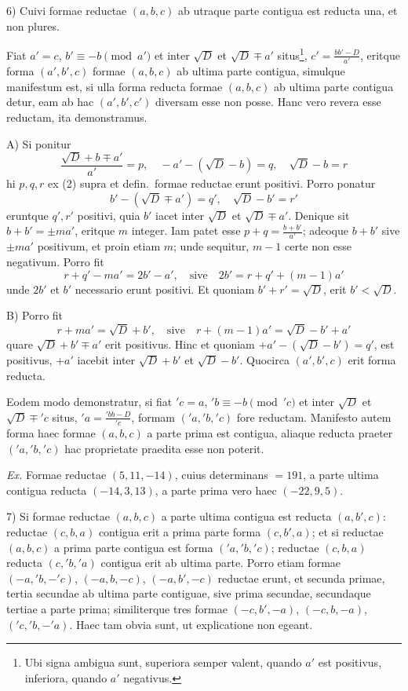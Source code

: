 \documentclass[12pt,a4paper]{article}
\theoremstyle{plain}
\theoremstyle{definition}
\theoremstyle{remark}
\begin{document}
6) Cuivi formae reductae $(a,b,c)$ ab utraque parte contigua est reducta una, et non plures.

Fiat $a'=c$, $b'\equiv -b\pmod{a'}$ et inter $\sqrt{D}$ et $\sqrt{D}\mp a'$ situs\footnote{Ubi signa ambigua sunt, superiora semper valent, quando $a'$ est positivus, inferiora, quando $a'$ negativus.}, $c'=\frac{bb'-D}{a'}$, eritque forma $(a',b',c)$ formae $(a,b,c)$ ab ultima parte contigua, simulque manifestum est, si ulla forma reducta formae $(a,b,c)$ ab ultima parte contigua detur, eam ab hac $(a',b',c')$ diversam esse non posse. Hanc vero revera esse reductam, ita demonstramus.

A) Si ponitur
\[\frac{\sqrt{D}+b\mp a'}{a'}=p,\quad -a'-(\sqrt{D}-b)=q,\quad \sqrt{D}-b=r\]
hi $p,q,r$ ex (2) supra et defin.\ formae reductae erunt positivi. Porro ponatur
\[b'-(\sqrt{D}\mp a')=q',\quad \sqrt{D}-b'=r'\]
eruntque $q',r'$ positivi, quia $b'$ iacet inter $\sqrt{D}$ et $\sqrt{D}\mp a'$. Denique sit $b+b'=\pm ma'$, eritque $m$ integer. Iam patet esse $p+q=\frac{b+b'}{a'}$; adeoque $b+b'$ sive $\pm ma'$ positivum, et proin etiam $m$; unde sequitur, $m-1$ certe non esse negativum. Porro fit
\[r+q'-ma'=2b'-a',\quad\text{sive}\quad 2b'=r+q'+(m-1)a'\]
unde $2b'$ et $b'$ necessario erunt positivi. Et quoniam $b'+r'=\sqrt{D}$, erit $b'<\sqrt{D}$.

B) Porro fit
\[r+ma'=\sqrt{D}+b',\quad\text{sive}\quad r+(m-1)a'=\sqrt{D}-b'+a'\]
quare $\sqrt{D}+b'\mp a'$ erit positivus. Hinc et quoniam $+a'-(\sqrt{D}-b')=q'$, est positivus, $+a'$ iacebit inter $\sqrt{D}+b'$ et $\sqrt{D}-b'$. Quocirca $(a',b',c)$ erit forma reducta.

Eodem modo demonstratur, si fiat $'c=a$, $'b\equiv -b\pmod{'c}$ et inter $\sqrt{D}$ et $\sqrt{D}\mp 'c$ situs, $'a=\frac{'bb-D}{'c}$, formam $('a,'b,'c)$ fore reductam. Manifesto autem forma haec formae $(a,b,c)$ a parte prima est contigua, aliaque reducta praeter $('a,'b,'c)$ hac proprietate praedita esse non poterit.

\textit{Ex.} Formae reductae $(5,11,-14)$, cuius determinans $=191$, a parte ultima contigua reducta $(-14,3,13)$, a parte prima vero haec $(-22,9,5)$.

7) Si formae reductae $(a,b,c)$ a parte ultima contigua est reducta $(a,b',c)$: reductae $(c,b,a)$ contigua erit a prima parte forma $(c,b',a)$; et si reductae $(a,b,c)$ a prima parte contigua est forma $('a,'b,'c)$; reductae $(c,b,a)$ reducta $(c,'b,'a)$ contigua erit ab ultima parte. Porro etiam formae $(-a,'b,-'c)$, $(-a,b,-c)$, $(-a,b',-c)$ reductae erunt, et secunda primae, tertia secundae ab ultima parte contiguae, sive prima secundae, secundaque tertiae a parte prima; similiterque tres formae $(-c,b',-a)$, $(-c,b,-a)$, $('c,'b,-'a)$. Haec tam obvia sunt, ut explicatione non egeant.
\end{document}
